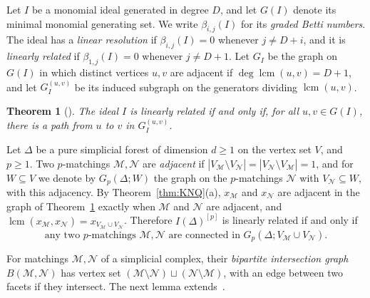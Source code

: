 \documentclass{amsart}
\DeclareMathOperator{\lcm}{lcm}
\newtheorem{Theorem}{Theorem}[section]
\theoremstyle{definition}
\theoremstyle{remark}
\begin{document}

Let $I$ be a monomial ideal generated in degree $D$, and let $G(I)$
denote its minimal monomial generating set.
We write $\beta_{i,j}(I)$ for its {\em graded Betti numbers}.
The ideal has a {\em linear resolution} if $\beta_{i,j}(I)=0$ whenever
$j\ne D+i$, and it is {\em linearly related} if $\beta_{1,j}(I)=0$
whenever $j\ne D+1$.
Let $G_I$ be the graph on $G(I)$ in which distinct vertices $u,v$ are
adjacent if $\deg\lcm(u,v)=D+1$, and let $G_I^{(u,v)}$ be its induced
subgraph on the generators dividing $\lcm(u,v)$.



\begin{Theorem}[{\cite[Corollary~2.2]{BHZ18powersedgeideals}}]\label{thm:linearlyrelated}
The ideal $I$ is linearly related if and only if, for all $u,v\in G(I)$, there is a path from $u$ to $v$ in $G_I^{(u,v)}$.
\end{Theorem}

Let $\Delta$ be a pure simplicial forest of dimension $d\geq 1$ on the vertex set $V$, and $p\geq 1$. Two $p$-matchings $\mathcal M,\mathcal N$ are \emph{adjacent} if $|V_{\mathcal M}\setminus V_{\mathcal N}|=|V_{\mathcal N}\setminus V_{\mathcal M}|=1$, and for $W\subseteq V$ we denote by $G_p(\Delta;W)$ the graph on the $p$-matchings $\mathcal N$ with $V_{\mathcal N}\subseteq W$, with this adjacency. By Theorem~\ref{thm:KNQ}(a), $x_{\mathcal M}$ and $x_{\mathcal N}$ are adjacent in the graph of Theorem~\ref{thm:linearlyrelated} exactly when $\mathcal M$ and $\mathcal N$ are adjacent, and $\lcm(x_{\mathcal M},x_{\mathcal N})=x_{V_{\mathcal M}\cup V_{\mathcal N}}$. Therefore $I(\Delta)^{[p]}$ is linearly related if and only if
\begin{equation}\label{eq:linrel}
\text{any two $p$-matchings $\mathcal M,\mathcal N$ are connected in }G_p(\Delta;V_{\mathcal M}\cup V_{\mathcal N}).
\end{equation}



For matchings $\mathcal M,\mathcal N$ of a simplicial complex, their
{\em bipartite intersection graph} $B(\mathcal M,\mathcal N)$ has vertex
set $(\mathcal M\setminus\mathcal N)\sqcup(\mathcal N\setminus\mathcal M)$,
with an edge between two facets if they intersect.
The next lemma extends~\cite[Lemma~3.3]{NQ}.


\end{document}
